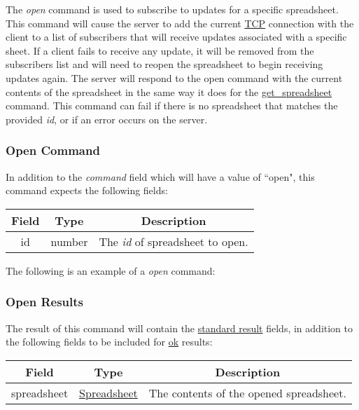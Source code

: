 The \emph{open} command is used to subscribe to updates for a specific spreadsheet. 
This command will cause the server to add the current \href{https://en.wikipedia.org/wiki/Transmission_Control_Protocol}{TCP} 
connection with the client to a list of subscribers that will receive updates 
associated with a specific sheet. If a client fails to receive any update, it 
will be removed from the subscribers list and will need to reopen the 
spreadsheet to begin receiving updates again. The server will respond to the 
open command with the current contents of the spreadsheet in the same way it 
does for the \hyperref[sec:message:get_spreadsheet]{get\_spreadsheet} command. 
This command can fail if there is no spreadsheet that matches the provided \emph{id}, 
or if an error occurs on the server.

\subsubsection{Open Command}
In addition to the \emph{command} field which will have a value of ``open", this command expects the following fields:
\begin{table}[H]
    \begin{center}
        \begin{tabular}{|c|c|c|}\hline
            Field & Type & Description \\\hline
            id & number & The \emph{id} of spreadsheet to open. \\\hline
        \end{tabular}
    \end{center}
\end{table}

The following is an example of a \emph{open} command:


\subsubsection{Open Results}
The result of this command will contain the \hyperref[sec:message:result]{standard result} fields, in addition to the following fields to be included for \underline{ok} results:
\begin{table}[H]
    \begin{center}
        \begin{tabular}{|c|c|c|}\hline
            Field & Type & Description \\\hline
            spreadsheet & \hyperref[sec:message:spreadsheet]{Spreadsheet} & The contents of the opened spreadsheet. \\\hline
        \end{tabular}
    \end{center}
\end{table}

